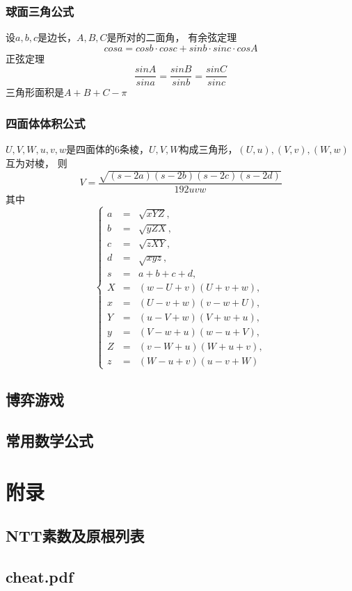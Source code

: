 \documentclass[a4paper]{article}
\begin{document}
\subsubsection{球面三角公式}

设$a, b, c$是边长，$A, B, C$是所对的二面角，
有余弦定理$$cos a = cos b \cdot cos c + sin b \cdot sin c \cdot cos A$$
正弦定理$$\frac{sin A}{sin a} = \frac{sin B}{sin b} = \frac{sin C}{sin c}$$
三角形面积是$A + B + C - \pi$

\subsubsection{四面体体积公式}

$U, V, W, u, v, w$是四面体的$6$条棱，$U, V, W$构成三角形，$(U, u), (V, v), (W, w)$互为对棱，
则$$V = \frac{\sqrt{(s - 2a)(s - 2b)(s - 2c)(s - 2d)}}{192 uvw}$$
其中$$\left\{\begin{array}{lll}
a & = & \sqrt{xYZ}, \\
b & = & \sqrt{yZX}, \\
c & = & \sqrt{zXY}, \\
d & = & \sqrt{xyz}, \\
s & = & a + b + c + d, \\ 
X & = & (w - U + v)(U + v + w), \\
x & = & (U - v + w)(v - w + U), \\
Y & = & (u - V + w)(V + w + u), \\
y & = & (V - w + u)(w - u + V), \\
Z & = & (v - W + u)(W + u + v), \\
z & = & (W - u + v)(u - v + W)
\end{array}\right.$$



\subsection{博弈游戏}

\subsection{常用数学公式}


\section{附录}
\subsection{NTT素数及原根列表}

\subsection{cheat.pdf}

\end{document}
